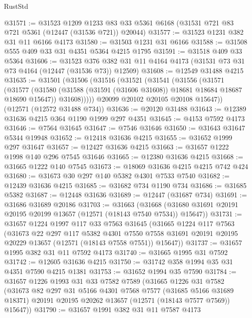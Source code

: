 \begin{lexlean}{RustStd}
\begin{coremodule}
@31571 := @31523
    @1209
    @1233
    @83
    @33
    @5361
    @6168
    (@31531 @721 @83 @721 @5361 (@12447 (@31536 @721)) @20044)
@31577 := @31523 @1231 @382 @31 @11 @6166 @4173
@31580 := @31503 @1231 @31 @6166
@31588 := @31508 @555 @409 @33 @31 @4351 @5364 @4215 @1795
@31591 := @31518 @409 @33 @5364
@31606 := @31523
    @376
    @382
    @31
    @11
    @4164
    @4173
    (@31531 @73 @31 @73 @4164 (@12447 (@31536 @73)) @12509)
@31608 := @12549 @31488 @4215
@31635 := @31501
    (@31506
      (@31516
        (@31521
          (@31541
            (@31556
              (@31571
                (@31577
                  (@31580 (@31588 (@31591 (@31606 @31608)) @18681 @18684 @18687 @18690 @15647))
                  @31608)))))
        @20099
        @20102
        @20105
        @20108
        @15647))
    (@12571 (@12572 @31488 @734))
@31636 := @20120 @31488
@31643 := @12389 @31636 @4215 @364 @1190 @1999 @297 @4351
@31645 := @4153 @7592 @4173
@31646 := @7564 @31645
@31647 := @7546 @31646
@31650 := @31643 @31647 @5344 @19948
@31652 := @12418 @31636 @4215
@31655 := @31652 @1999 @297 @31647
@31657 := @12427 @31636 @4215
@31663 := @31657 @1222 @1998 @140 @296 @7545 @31646
@31665 := @12380 @31636 @4215
@31668 := @31665 @1222 @140 @7545
@31673 := @18069 @31636 @4215 @4215 @742 @424
@31680 := @31673 @30 @297 @140 @5382 @4301 @7533 @7540
@31682 := @12439 @31636 @4215
@31685 := @31682 @734 @1190 @734
@31686 := @31685 @5382
@31687 := @12448 @31636
@31689 := @12447 (@31687 @734)
@31691 := @31686 @31689 @20186
@31703 := @31663
    (@31668 (@31680 @31691 @20191 @20195 @20199 @13657 (@12571 (@18143 @7540 @7534)) @15647))
@31731 := @31657
    @1224
    @1997
    @117
    @33
    @7563
    @31645
    (@31665
      @1224
      @117
      @7563
      (@31673
        @22
        @297
        @117
        @5382
        @4301
        @7550
        @7558
        @31691
        @20191
        @20195
        @20229
        @13657
        (@12571 (@18143 @7558 @7551))
        @15647))
@31737 := @31657 @1995 @382 @31 @11 @7592 @4173
@31740 := @31665 @1995 @31 @7592
@31742 := @12605 @31636 @4215
@31750 := @31742 @358 @1994 @35 @31 @4351 @7590 @4215 @1381
@31753 := @31652 @1994 @35 @7590
@31784 := @31657
    @1226
    @1993
    @31
    @33
    @7582
    @7589
    (@31665
      @1226
      @31
      @7582
      (@31673
        @82
        @297
        @31
        @5166
        @4301
        @7568
        @7577
        (@31685 @5166 @31689 @18371)
        @20191
        @20195
        @20262
        @13657
        (@12571 (@18143 @7577 @7569))
        @15647))
@31790 := @31657 @1991 @382 @31 @11 @7587 @4173

\end{coremodule}
\end{lexlean}
